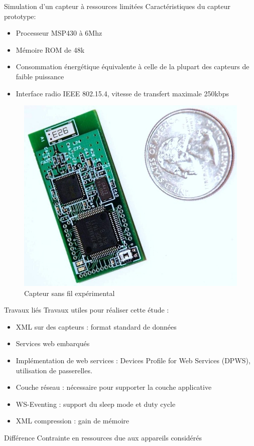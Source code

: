 \begin{frame}{Simulation d'un capteur à ressources limitées}
Caractéristiques du capteur prototype:
\begin{itemize}
\item Processeur MSP430 à 6Mhz
\item Mémoire ROM de 48k
\item Consommation énergétique équivalente à celle de la plupart des capteurs de faible puissance
\item Interface radio IEEE 802.15.4, vitesse de transfert maximale 250kbps
\end{itemize}
\begin{figure}
  \centering
  \includegraphics[scale=0.15]{figures/tws08-000.jpg}
  \caption{Capteur sans fil expérimental}
 \end{figure} 
\end{frame}

\begin{frame}{Travaux liés}
Travaux utiles pour réaliser cette étude :
\begin{itemize}
\item XML sur des capteurs : format standard de données
\item Services web embarqués 
\item Implémentation de web services : Devices Profile for Web Services (DPWS), utilisation de passerelles.
\item Couche réseau : nécessaire pour supporter la couche applicative
\item WS-Eventing : support du sleep mode et duty cycle
\item XML compression : gain de mémoire
\end{itemize}
\begin{block}{Différence}
Contrainte en ressources due aux appareils considérés
\end{block}
\end{frame}

